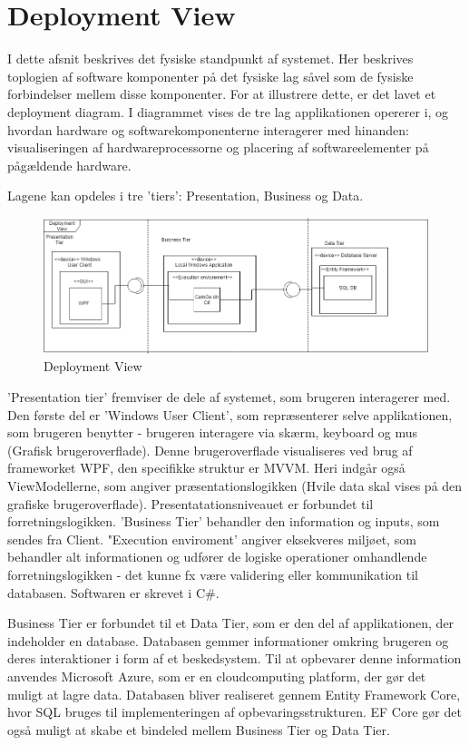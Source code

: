 \documentclass[Arkitektur/System_main.tex]{subfiles}
\begin{document}
\section{Deployment View}
I dette afsnit beskrives det fysiske standpunkt af systemet. Her beskrives toplogien af software komponenter på det fysiske lag såvel som de fysiske forbindelser mellem disse komponenter. For at illustrere dette, er det lavet et deployment diagram.
I diagrammet vises de tre lag applikationen opererer i, og hvordan hardware og softwarekomponenterne interagerer med hinanden: visualiseringen af hardwareprocessorne og placering af softwareelementer på pågældende hardware. 

Lagene kan opdeles i tre 'tiers': Presentation, Business og Data.\\
\begin{figure}[H]
    \centering
    \includegraphics[width=\linewidth]{Arkitektur/4+1View/Graphics/DeploymentDiagram.png}
    \caption{Deployment View}
\end{figure}
'Presentation tier' fremviser de dele af systemet, som brugeren interagerer med. Den første del er 'Windows User Client', som repræsenterer selve applikationen, som brugeren benytter - brugeren interagere via skærm, keyboard og mus (Grafisk brugeroverflade). Denne brugeroverflade visualiseres ved brug af frameworket WPF, den specifikke struktur er MVVM. Heri indgår også ViewModellerne, som angiver præsentationslogikken (Hvile data skal vises på den grafiske brugeroverflade). Presentatationsniveauet er forbundet til forretningslogikken. 'Business Tier' behandler den information og inputs, som sendes fra Client. "Execution enviroment' angiver eksekveres miljøet, som behandler alt informationen og udfører de logiske operationer omhandlende forretningslogikken - det kunne fx være validering eller kommunikation til databasen. Softwaren er skrevet i C\#.  

Business Tier er forbundet til et Data Tier, som er den del af applikationen, der indeholder en database. Databasen gemmer informationer omkring brugeren og deres interaktioner i form af et beskedsystem. Til at opbevarer denne information anvendes Microsoft Azure, som er en cloudcomputing platform, der gør det muligt at lagre data. Databasen bliver realiseret gennem Entity Framework Core, hvor SQL bruges til implementeringen af opbevaringsstrukturen. EF Core gør det også muligt at skabe et bindeled mellem Business Tier og Data Tier. 
\end{document}
